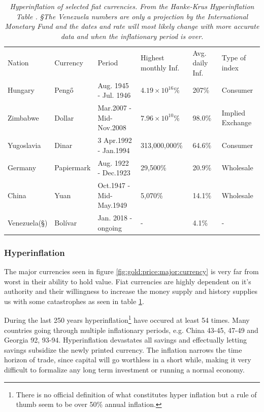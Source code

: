\begin{table}[!htb]
	\begin{tabular}{llllll}
		Nation & Currency & Period & Highest monthly Inf. & Avg. daily Inf. & Type of index\\
		Hungary & Pengő & Aug. 1945 - Jul. 1946 & $ 4.19 × 10^{16}\% $ & 207\% & Consumer \\
		Zimbabwe & Dollar & Mar.2007 - Mid-Nov.2008 & $7.96 × 10^{10}\%$ & 98.0\% & Implied Exchange \\
		Yugoslavia & Dinar & 3 Apr.1992 - Jan.1994 & 313,000,000\% & 64.6\% & Consumer \\
		Germany & Papiermark & Aug. 1922 - Dec.1923 & 29,500\% & 20.9\% & Wholesale \\
		China & Yuan & Oct.1947 - Mid-May.1949 & 5,070\% & 14.1\% &	Wholesale \\
		Venezuela(§) & Bolívar & Jan. 2018 - ongoing & - & 4.1\% & - \\ 

	\end{tabular}
	\caption{\textit{ Hyperinflation of selected fiat currencies. From the Hanke-Krus Hyperinflation Table \cite{hanke:krus:hyperinflation:table}. §The Venezuela numbers are only a projection by the International Monetary Fund
			and the dates and rate will most likely change with more accurate data\cite{hanke:hyperinflation} and when the inflationary period is over.
	}}
	\label{tab:inflation}
\end{table}

\subsubsection{Hyperinflation}

The major currencies seen in figure \ref{fig:gold:price:major:currency} is very far from worst in their ability to hold value. Fiat currencies are highly dependent on it's authority and their willingness to increase the money supply and history supplies us with some catastrophes as seen in table \ref{tab:inflation}.

During the last 250 years hyperinflation\footnote{There is no official definition of what constitutes hyper inflation but a rule of thumb seem to be over 50\% annual inflation.} have occured at least 54 times\cite{hanke:krus:hyperinflation:table}\cite{hanke:hyperinflation}. Many countries going through multiple inflationary periods, e.g. China 43-45, 47-49 and Georgia 92, 93-94. Hyperinflation devastates all savings and effectually letting savings subsidize the newly printed currency. The inflation narrows the time horizon of trade, since capital will go worthless in a short while, making it very difficult to formalize any long term investment or running a normal economy. 

